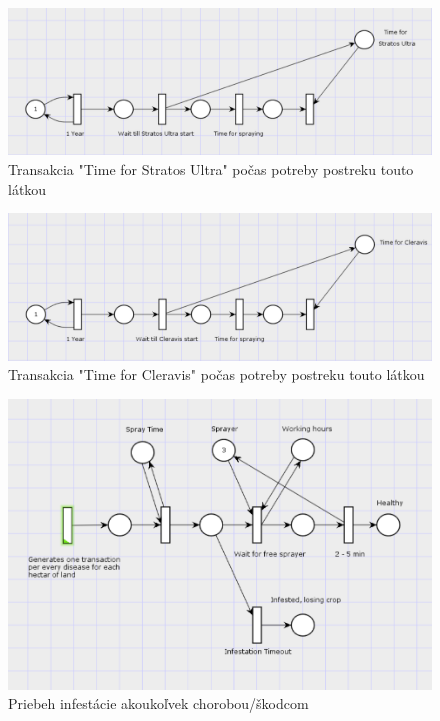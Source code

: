 \documentclass[11pt,a4paper,titlepage]{article}
\begin{document}
\begin{figure}[ht!]
\centering
\includegraphics[scale=0.3]{img/GenStratosUltraTime.png}
\caption{Transakcia "Time for Stratos Ultra" počas potreby postreku touto látkou}
\end{figure}

\begin{figure}[ht!]
\centering
\includegraphics[scale=0.3]{img/GenCleravisTime.png}
\caption{Transakcia "Time for Cleravis" počas potreby postreku touto látkou}
\end{figure}

\begin{figure}[ht!]
\centering
\includegraphics[scale=0.3]{img/Infestation.png}
\caption{Priebeh infestácie akoukoľvek chorobou/škodcom}
\end{figure}
\end{document}
